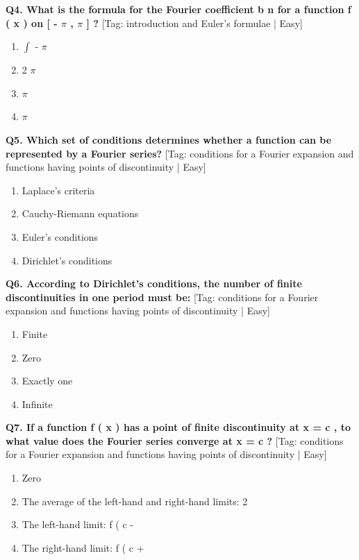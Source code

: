 \noindent\textbf{Q4. What is the formula for the Fourier coefficient b n for a function f ( x ) on [ - $\pi$ , $\pi$ ] ?} \hfill [Tag: introduction and Euler's formulae | Easy]
\begin{enumerate}[label=(\alph*),topsep=2pt,itemsep=1pt,partopsep=0pt,parsep=0pt]
    \item {{$\int$ - $\pi$}}
    \item {{2 $\pi$}}
    \item {{$\pi$}}
    \item {{$\pi$}}
\end{enumerate}
\vspace{2mm}

\noindent\textbf{Q5. Which set of conditions determines whether a function can be represented by a Fourier series?} \hfill [Tag: conditions for a Fourier expansion and functions having points of discontinuity | Easy]
\begin{enumerate}[label=(\alph*),topsep=2pt,itemsep=1pt,partopsep=0pt,parsep=0pt]
    \item {{Laplace's criteria}}
    \item {{Cauchy-Riemann equations}}
    \item {{Euler's conditions}}
    \item {{Dirichlet's conditions}}
\end{enumerate}
\vspace{2mm}

\noindent\textbf{Q6. According to Dirichlet's conditions, the number of finite discontinuities in one period must be:} \hfill [Tag: conditions for a Fourier expansion and functions having points of discontinuity | Easy]
\begin{enumerate}[label=(\alph*),topsep=2pt,itemsep=1pt,partopsep=0pt,parsep=0pt]
    \item {{Finite}}
    \item {{Zero}}
    \item {{Exactly one}}
    \item {{Infinite}}
\end{enumerate}
\vspace{2mm}

\noindent\textbf{Q7. If a function f ( x ) has a point of finite discontinuity at x = c , to what value does the Fourier series converge at x = c ?} \hfill [Tag: conditions for a Fourier expansion and functions having points of discontinuity | Easy]
\begin{enumerate}[label=(\alph*),topsep=2pt,itemsep=1pt,partopsep=0pt,parsep=0pt]
    \item {{Zero}}
    \item {{The average of the left-hand and right-hand limits: 2}}
    \item {{The left-hand limit: f ( c -}}
    \item {{The right-hand limit: f ( c +}}
\end{enumerate}
\vspace{2mm}

